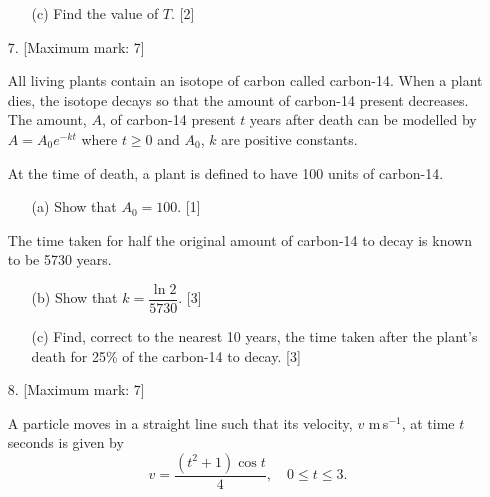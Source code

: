 \documentclass[12pt, twoside]{article}
\begin{document}
\begin{enumerate}[itemsep=0.15cm]
\begin{enumerate}[itemsep=0.1cm]
  \item[(c)] Find the value of $T$. \hfill [2]
\end{enumerate}


\newpage

\item[7.] [Maximum mark: 7]

All living plants contain an isotope of carbon called carbon-14. When a plant dies,
the isotope decays so that the amount of carbon-14 present decreases. The amount, $A$,
of carbon-14 present $t$ years after death can be modelled by $A = A_0 e^{-kt}$
where $t \geq 0$ and $A_0$, $k$ are positive constants.

At the time of death, a plant is defined to have 100 units of carbon-14.

\begin{enumerate}[itemsep=0.1cm]
  \item[(a)] Show that $A_0 = 100$. \hfill [1]
\end{enumerate}

The time taken for half the original amount of carbon-14 to decay is known to be 5730 years.

\begin{enumerate}[itemsep=0.1cm]
  \item[(b)] Show that $k = \dfrac{\ln 2}{5730}$. \hfill [3]
  \item[(c)] Find, correct to the nearest 10 years, the time taken after the plant's death
  for 25\% of the carbon-14 to decay. \hfill [3]
\end{enumerate}


\newpage

\item[8.] [Maximum mark: 7]

A particle moves in a straight line such that its velocity, $v$ m\,s$^{-1}$, at
time $t$ seconds is given by
\[v = \frac{(t^2 + 1)\cos t}{4}, \quad 0 \leq t \leq 3.\]


\end{enumerate}
\end{document}
